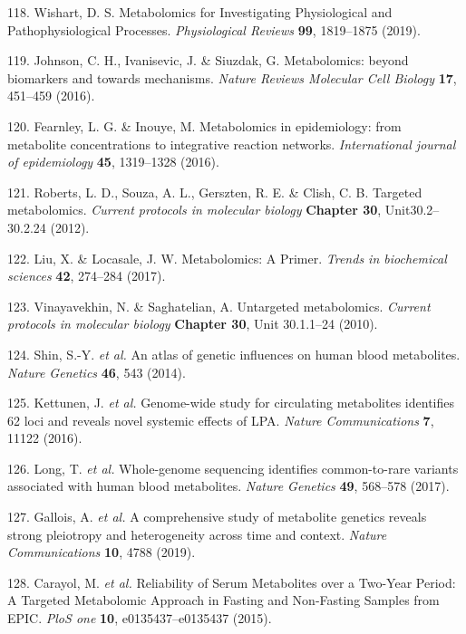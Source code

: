 \documentclass[11pt,twoside]{bristolthesis}
\begin{document}
\leavevmode\hypertarget{ref-Wishart2019}{}%
118. Wishart, D. S. Metabolomics for Investigating Physiological and Pathophysiological Processes. \emph{Physiological Reviews} \textbf{99}, 1819--1875 (2019).

\leavevmode\hypertarget{ref-Johnson2016}{}%
119. Johnson, C. H., Ivanisevic, J. \& Siuzdak, G. Metabolomics: beyond biomarkers and towards mechanisms. \emph{Nature Reviews Molecular Cell Biology} \textbf{17}, 451--459 (2016).

\leavevmode\hypertarget{ref-Fearnley2016}{}%
120. Fearnley, L. G. \& Inouye, M. Metabolomics in epidemiology: from metabolite concentrations to integrative reaction networks. \emph{International journal of epidemiology} \textbf{45}, 1319--1328 (2016).

\leavevmode\hypertarget{ref-Roberts2012}{}%
121. Roberts, L. D., Souza, A. L., Gerszten, R. E. \& Clish, C. B. Targeted metabolomics. \emph{Current protocols in molecular biology} \textbf{Chapter 30}, Unit30.2--30.2.24 (2012).

\leavevmode\hypertarget{ref-Liu2017b}{}%
122. Liu, X. \& Locasale, J. W. Metabolomics: A Primer. \emph{Trends in biochemical sciences} \textbf{42}, 274--284 (2017).

\leavevmode\hypertarget{ref-Vinayavekhin2010}{}%
123. Vinayavekhin, N. \& Saghatelian, A. Untargeted metabolomics. \emph{Current protocols in molecular biology} \textbf{Chapter 30}, Unit 30.1.1--24 (2010).

\leavevmode\hypertarget{ref-Shin2014}{}%
124. Shin, S.-Y. \emph{et al.} An atlas of genetic influences on human blood metabolites. \emph{Nature Genetics} \textbf{46}, 543 (2014).

\leavevmode\hypertarget{ref-Kettunen2016}{}%
125. Kettunen, J. \emph{et al.} Genome-wide study for circulating metabolites identifies 62 loci and reveals novel systemic effects of LPA. \emph{Nature Communications} \textbf{7}, 11122 (2016).

\leavevmode\hypertarget{ref-Long2017}{}%
126. Long, T. \emph{et al.} Whole-genome sequencing identifies common-to-rare variants associated with human blood metabolites. \emph{Nature Genetics} \textbf{49}, 568--578 (2017).

\leavevmode\hypertarget{ref-Gallois2019}{}%
127. Gallois, A. \emph{et al.} A comprehensive study of metabolite genetics reveals strong pleiotropy and heterogeneity across time and context. \emph{Nature Communications} \textbf{10}, 4788 (2019).

\leavevmode\hypertarget{ref-Carayol2015}{}%
128. Carayol, M. \emph{et al.} Reliability of Serum Metabolites over a Two-Year Period: A Targeted Metabolomic Approach in Fasting and Non-Fasting Samples from EPIC. \emph{PloS one} \textbf{10}, e0135437--e0135437 (2015).
\end{document}
